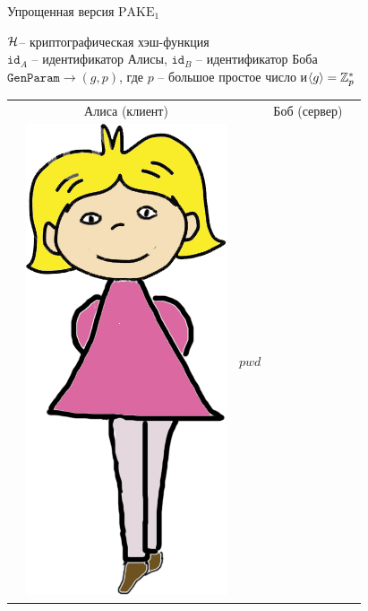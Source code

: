 \documentclass[usenames,dvipsnames,8pt,aspectratio=169]{beamer}
\begin{document}
\begin{frame}{Упрощенная версия $\text{PAKE}_1$}
\Large
\vspace{-20pt}
\begin{center}
$\mathcal{H}$-- криптографическая хэш-функция \\[2pt]
$\mathtt{id}_{A}$ -- идентификатор Алисы, $\mathtt{id}_{B}$ -- идентификатор Боба\\[2pt]
$\mathtt{GenParam} \rightarrow (g, p)$, где $p$ -- большое простое число и$\langle g \rangle = {{\mathbb Z}}_p^\ast$
\large 
\begin{center}
\begin{tabular}{l c c c l}
	& Алиса (клиент)  & & Боб (сервер) &  \\
	& \multirow{2}{*}{\includegraphics[scale=0.15]{Alice}} & {\huge $pwd$} &  \hspace{-20pt}

\end{tabular}
\end{center}
\end{center}
\end{frame}
\end{document}
